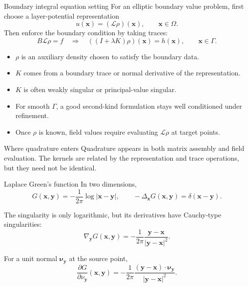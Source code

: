 \documentclass[aspectratio=169,11pt]{beamer}
\newcommand{\x}{\bm{x}}
\newcommand{\y}{\bm{y}}
\newcommand{\bnu}{\bm{\nu}}
\begin{document}
\begin{frame}{Boundary integral equation setting}
\small
For an elliptic boundary value problem, first choose a layer-potential
representation
\[
  u(\x)=(\mathcal{L}\rho)(\x),\qquad \x\in\Omega .
\]
Then enforce the boundary condition by taking traces:
\[
  B\mathcal{L}\rho=f
  \quad\Longrightarrow\quad
  ((I+\lambda K)\rho)(\x)=h(\x),\qquad \x\in\Gamma .
\]

\begin{itemize}
  \item $\rho$ is an auxiliary density chosen to satisfy the boundary data.
  \item $K$ comes from a boundary trace or normal derivative of the representation.
  \item $K$ is often weakly singular or principal-value singular.
  \item For smooth $\Gamma$, a good second-kind formulation stays well conditioned under refinement.
  \item Once $\rho$ is known, field values require evaluating $\mathcal{L}\rho$ at target points.
\end{itemize}

\begin{block}{Where quadrature enters}
Quadrature appears in both matrix assembly and field evaluation.  The kernels
are related by the representation and trace operations, but they need not be
identical.
\end{block}
\end{frame}

\begin{frame}{Laplace Green's function}
\small
In two dimensions,
\[
  G(\x,\y)=-\frac{1}{2\pi}\log|\x-\y|,
  \qquad
  -\Delta_{\x}G(\x,\y)=\delta(\x-\y).
\]

The singularity is only logarithmic, but its derivatives have Cauchy-type singularities:
\[
  \nabla_{\y}G(\x,\y)
  =
  -\frac{1}{2\pi}\frac{\y-\x}{|\y-\x|^2}.
\]

\vspace{2mm}
For a unit normal $\bnu_{\y}$ at the source point,
\[
  \frac{\partial G}{\partial \nu_{\y}}(\x,\y)
  =
  -\frac{1}{2\pi}
  \frac{(\y-\x)\cdot\bnu_{\y}}{|\y-\x|^2}.
\]
\end{frame}
\end{document}
